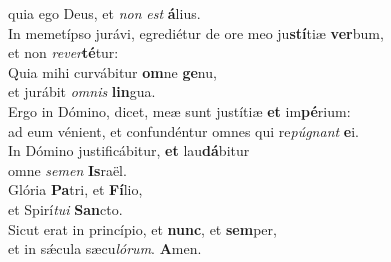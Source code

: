 \evenverse quia ego Deus, et \textit{non} \textit{est} \textbf{á}lius.\\
\oddverse In memetípso jurávi, egrediétur de ore meo ju\textbf{stí}tiæ \textbf{ver}bum,~\*\\
\oddverse et non \textit{re}\textit{ver}\textbf{té}tur:\\
\evenverse Quia mihi curvábitur \textbf{om}ne \textbf{ge}nu,~\*\\
\evenverse et jurábit \textit{om}\textit{nis} \textbf{lin}gua.\\
\oddverse Ergo in Dómino, dicet, meæ sunt justítiæ \textbf{et} im\textbf{pé}rium:~\*\\
\oddverse ad eum vénient, et confundéntur omnes qui re\textit{pú}\textit{gnant} \textbf{e}i.\\
\evenverse In Dómino justificábitur, \textbf{et} lau\textbf{dá}bitur~\*\\
\evenverse omne \textit{se}\textit{men} \textbf{Is}raël.\\
\oddverse Glória \textbf{Pa}tri, et \textbf{Fí}lio,~\*\\
\oddverse et Spirí\textit{tu}\textit{i} \textbf{San}cto.\\
\evenverse Sicut erat in princípio, et \textbf{nunc}, et \textbf{sem}per,~\*\\
\evenverse et in sǽcula sæcu\textit{ló}\textit{rum}. \textbf{A}men.\\
